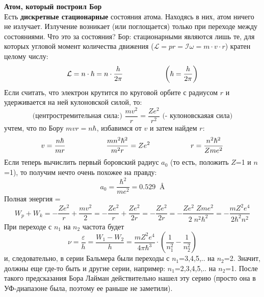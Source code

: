 \documentclass[12pt,epsfig,color,russian]{article}
\begin{document}
{\Large \bf Атом, который построил Бор}\\
Есть {\bf дискретные стационарные} состояния атома. Находясь в них, атом ничего не излучает. Излучение возникает (или поглощается) только при переходе между состояниями. Что это за состояния? Бор: стационарными являются лишь те, для которых угловой момент количества движения ($\mathcal{L}=pr=\mathcal{I}\omega=m\cdot v\cdot r$)
кратен целому числу:
\begin{displaymath}
\mathcal{L}=n\cdot\hbar=n\cdot\frac{h}{2\pi}\hspace{20mm}\left(\hbar=\frac{h}{2\pi}\right)
\end{displaymath}
Если считать, что электрон крутится по круговой орбите с радиусом $r$ и удерживается на ней кулоновской силой, то:
\begin{displaymath}
\texttt{(центростремительная сила:) }
\frac{mv^2}r =\frac{Ze^2}{r^2}
\texttt{ (- кулоновскаяая сила)}
\end{displaymath}
учтем, что по Бору $mvr=n\hbar$,  избавимся от $v$ и затем найдем $r$:
\begin{displaymath}
v=\frac{n\hbar}{mr}\hspace{20mm} \frac{mn^2\hbar^2}{m^2r} =Ze^2\hspace{20mm}r=\frac{n^2\hbar^2}{Zme^2}
\end{displaymath}
Если теперь вычислить первый боровский радиус $a_0$ (то есть, положить $Z$=1 и $n$=1), то получим нечто очень похожее на правду:
\begin{displaymath}
a_0=\frac{\hbar^2}{me^2}=0.529\;\;{\texttt{\AA}}
\end{displaymath}
Полная энергия =
\begin{displaymath}
W_p+W_k=-\frac{Ze^2}{r}+\frac{mv^2}2=-\frac{Ze^2}{r}+\frac{Ze^2}{2r}=-\frac{Ze^2}{2r}=
-\frac{Ze^2\;Zme^2}{2\;n^2\hbar^2}=-\frac{mZ^2e^4}{2\hbar^2n^2}
\end{displaymath}
При переходе с $n_1$ на $n_2$ частота будет
\begin{displaymath}
\nu=\frac{\varepsilon}{h}=\frac{W_1-W_2}{h}=\frac{mZ^2e^4}{4\pi\hbar^3}\cdot\left(\frac1{n_1^2}-\frac1{n_2^2}\right)
\end{displaymath}
и, следовательно, в серии Бальмера были переходы с $n_1$=3,4,5,.. на $n_2$=2. Значит, должны еще где-то быть и другие серии, например: $n_1$=2,3,4,5,.. на $n_2$=1.  После такого предсказания Бора Лайман действительно нашел эту серию (просто она в УФ-диапазоне была, поэтому ее раньше не заметили).
\end{document}
